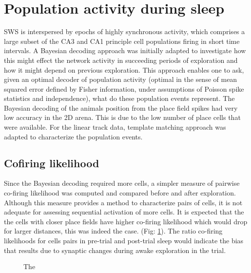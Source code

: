 \section{Population activity during sleep}

SWS is interspersed by epochs of highly synchronous activity, which comprises a large subset of the CA3 and CA1 principle cell populations firing in short time intervals. A Bayesian decoding approach was initially adapted to investigate how this might effect the network activity in succeeding periods of exploration and how it might depend on previous exploration. This approach enables one to ask, given an optimal decoder of population activity (optimal in the sense of mean squared error defined by Fisher information, under assumptions of Poisson spike statistics  and independence), what do these population events represent. The Bayesian decoding of the animals position from the place field spikes had very low accuracy in the 2D arena. This is due to the low number of place cells that were available. For the linear track data, template matching approach was adapted to characterize the population events. 

\subsection{Cofiring likelihood}
Since the Bayesian decoding required more cells, a simpler measure of pairwise co-firing likelihood was computed and compared before and after exploration. Although this measure provides a method to characterize pairs of cells, it is not adequate for assessing sequential activation of more cells. It is expected that the the cells with closer place fields have higher co-firing likelihood which would drop for larger distances, this was indeed the case. (Fig: \ref{fig:cfvsdist}). The ratio co-firing likelihoods for cells pairs in pre-trial and post-trial sleep would indicate the bias that results due to synaptic changes during awake exploration in the trial.
\begin{figure}[htb!]
\centering
{}
\caption[Pairwise cofiring]{The }
\label{fig:cfvsdist}
\end{figure}

